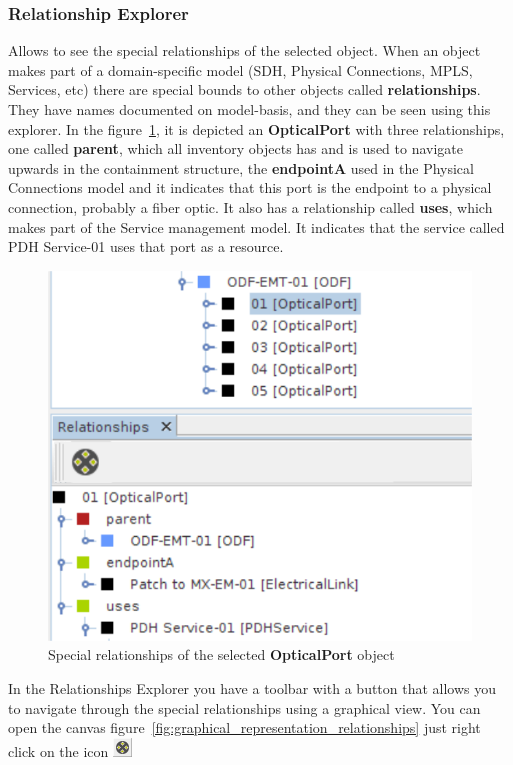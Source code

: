 \documentclass[a4paper]{article}
\begin{document}
	\subsubsection{Relationship Explorer} \label{sec:extra_explorers_relationship_explorer}
		Allows to see the special relationships of the selected object. When an object makes part of a domain-specific model (SDH, Physical Connections, MPLS, Services, etc) there are special bounds to other objects called \textbf{relationships}. They have names documented on model-basis, and they can be seen using this explorer. In the figure~\ref{fig:navigation_tree_relationship_explorer}, it is depicted an \textbf{OpticalPort} with three relationships, one called \textbf{parent}, which all inventory objects has and is used to navigate upwards in the containment structure, the \textbf{endpointA} used in the Physical Connections model and it indicates that this port is the endpoint to a physical connection, probably a fiber optic. It also has a relationship called \textbf{uses}, which makes part of the Service management model. It indicates that the service called PDH Service-01 uses that port as a resource.
		
		\begin{figure}[h!]
			\centering
			\includegraphics[width=0.4\linewidth]{img/navigation_tree_relationship_explorer.png}
			\caption{Special relationships of the selected \textbf{OpticalPort} object}
			\label{fig:navigation_tree_relationship_explorer}
		\end{figure}
		
		In the Relationships Explorer you have a toolbar with a button that allows you to navigate through the special relationships using a graphical view. You can open the canvas figure~\ref{fig:graphical_representation_relationships} just right click on the icon \includegraphics[width=0.5cm]{img/icon_graphical_representation_relationships.png}		
						
\end{document}
